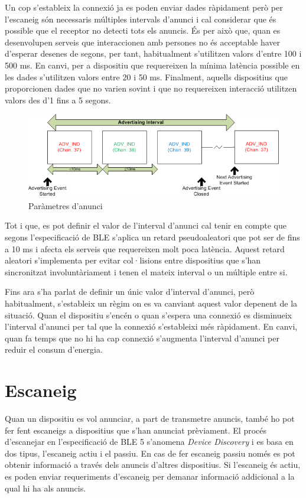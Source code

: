 Un cop s'estableix la connexió ja es poden enviar dades ràpidament però per l'escaneig són necessaris múltiples intervals d'anunci i cal considerar que és possible que el receptor no detecti tots els anuncis. 
És per això que, quan es desenvolupen serveis que interaccionen amb persones no és acceptable haver d'esperar desenes de segons, per tant, habitualment s'utilitzen valors d'entre 100 i 500 ms.
En canvi, per a dispositiu que requereixen la mínima latència possible en les dades s'utilitzen valors entre 20 i 50 ms.
Finalment, aquells dispositius que proporcionen dades que no varien sovint i que no requereixen interacció utilitzen valors des d'1 fins a 5 segons.

\begin{figure}[h!]
	\begin{center}
		\includegraphics{./images/advertisement_params.png}
		\caption{Paràmetres d'anunci \cite{advertisment_params}}
		\label{fig:advertisment_params}
	\end{center}
\end{figure}

Tot i que, es pot definir el valor de l'interval d'anunci cal tenir en compte que segons l'especificació de BLE s'aplica un retard pseudoaleatori que pot ser de fins a 10 ms i afecta els serveis que requereixen molt poca latència.
Aquest retard aleatori s'implementa per evitar col·lisions entre dispositius que s'han sincronitzat involuntàriament i tenen el mateix interval o un múltiple entre si.

Fins ara s'ha parlat de definir un únic valor d'interval d'anunci, però habitualment, s'estableix un règim on es va canviant aquest valor depenent de la situació.
Quan el dispositiu s'encén o quan s'espera una connexió es disminueix l'interval d'anunci per tal que la connexió s'estableixi més ràpidament.
En canvi, quan fa temps que no hi ha cap connexió s'augmenta l'interval d'anunci per reduir el consum d'energia. 


\section{Escaneig}
Quan un dispositiu es vol anunciar, a part de transmetre anuncis, també ho pot fer fent escaneigs a dispositius que s'han anunciat prèviament.
El procés d'escanejar en l'especificació de BLE 5 s'anomena \textit{Device Discovery} i es basa en dos tipus, l'escaneig actiu i el passiu.
En cas de fer escaneig passiu només es pot obtenir informació a través dels anuncis d'altres dispositius.
Si l'escaneig és actiu, es poden enviar requeriments d'escaneig per demanar informació addicional a la qual hi ha als anuncis.


